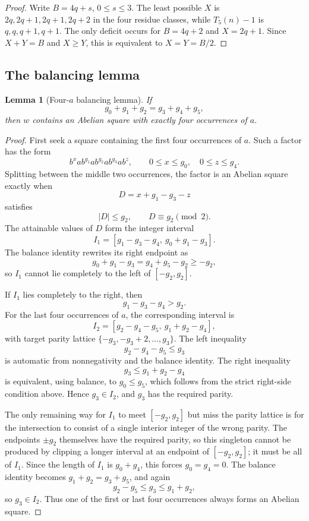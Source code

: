 \documentclass[11pt]{article}
\newtheorem{lemma}[theorem]{Lemma}
\theoremstyle{definition}
\begin{document}
\begin{proof}
Write $B=4q+s$, $0\le s\le3$. The least possible $X$ is $2q,2q+1,2q+1,2q+2$ in the four residue classes, while $T_5(n)-1$ is $q,q,q+1,q+1$. The only deficit occurs for $B=4q+2$ and $X=2q+1$. Since $X+Y=B$ and $X\ge Y$, this is equivalent to $X=Y=B/2$.
\end{proof}

\subsection{The balancing lemma}

\begin{lemma}[Four-$a$ balancing lemma]\label{lem:balancing}
If
\[
 g_0+g_1+g_2=g_3+g_4+g_5,
\]
then $w$ contains an Abelian square with exactly four occurrences of $a$.
\end{lemma}

\begin{proof}
First seek a square containing the first four occurrences of $a$. Such a factor has the form
\[
 b^x a b^{g_1}a b^{g_2}a b^{g_3}a b^z,
 \qquad0\le x\le g_0,\quad0\le z\le g_4.
\]
Splitting between the middle two occurrences, the factor is an Abelian square exactly when
\[
 D=x+g_1-g_3-z
\]
satisfies
\[
 |D|\le g_2,\qquad D\equiv g_2\pmod2.
\]
The attainable values of $D$ form the integer interval
\[
 I_1=[g_1-g_3-g_4,\ g_0+g_1-g_3].
\]
The balance identity rewrites its right endpoint as
\[
 g_0+g_1-g_3=g_4+g_5-g_2\ge-g_2,
\]
so $I_1$ cannot lie completely to the left of $[-g_2,g_2]$.

If $I_1$ lies completely to the right, then
\[
 g_1-g_3-g_4>g_2.
\]
For the last four occurrences of $a$, the corresponding interval is
\[
 I_2=[g_2-g_4-g_5,\ g_1+g_2-g_4],
\]
with target parity lattice $\{-g_3,-g_3+2,\ldots,g_3\}$. The left inequality
\[
 g_2-g_4-g_5\le g_3
\]
is automatic from nonnegativity and the balance identity. The right inequality
\[
 g_3\le g_1+g_2-g_4
\]
is equivalent, using balance, to $g_0\le g_5$, which follows from the strict right-side condition above. Hence $g_3\in I_2$, and $g_3$ has the required parity.

The only remaining way for $I_1$ to meet $[-g_2,g_2]$ but miss the parity lattice is for the intersection to consist of a single interior integer of the wrong parity. The endpoints $\pm g_2$ themselves have the required parity, so this singleton cannot be produced by clipping a longer interval at an endpoint of $[-g_2,g_2]$; it must be all of $I_1$. Since the length of $I_1$ is $g_0+g_4$, this forces $g_0=g_4=0$. The balance identity becomes $g_1+g_2=g_3+g_5$, and again
\[
 g_2-g_5\le g_3\le g_1+g_2,
\]
so $g_3\in I_2$. Thus one of the first or last four occurrences always forms an Abelian square.
\end{proof}
\end{document}

